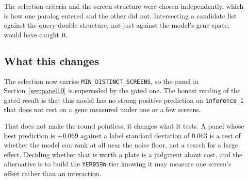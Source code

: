 The selection criteria and the screen structure were chosen independently, which
is how one paralog entered and the other did not. Intersecting a candidate list
against the query-double structure, not just against the model's gene space,
would have caught it.

\subsection{What this changes}

The selection now carries \texttt{MIN\_DISTINCT\_SCREENS}, so the panel in
Section~\ref{sec:panel10} is superseded by the gated one. The honest reading of the gated result
is that this model has no strong positive prediction on \texttt{inference\_1}
that does not rest on a gene measured under one or a few screens.

That does not make the round pointless, it changes what it tests. A panel whose
best prediction is $+0.069$ against a label standard deviation of $0.063$ is a
test of whether the model can rank at all near the noise floor, not a search for
a large effect. Deciding whether that is worth a plate is a judgment about cost,
and the alternative is to build the \texttt{YER059W} tier knowing it may measure
one screen's offset rather than an interaction.
